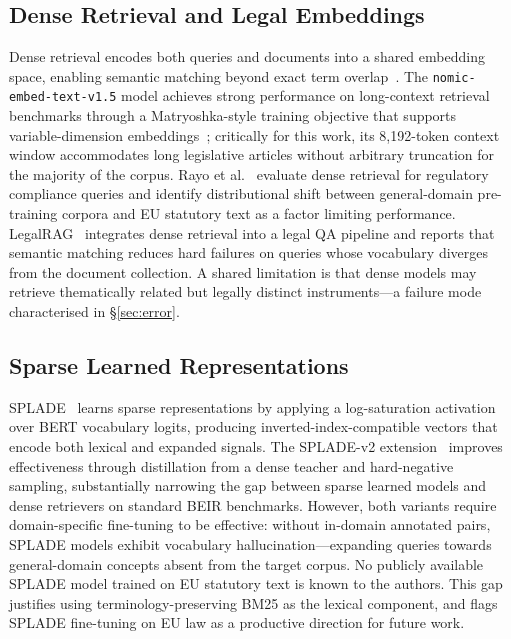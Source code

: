 \documentclass[sigconf,screen]{acmart}
\newcommand{\nomic}{\texttt{nomic-embed-text-v1.5}\xspace}
\begin{document}
\subsection{Dense Retrieval and Legal Embeddings}
\label{sec:related-dense}

Dense retrieval encodes both queries and documents into a shared
embedding space, enabling semantic matching beyond exact term
overlap~\cite{nussbaum2024nomic}.  The \nomic model achieves strong
performance on long-context retrieval benchmarks through a
Matryoshka-style training objective that supports variable-dimension
embeddings~\cite{nussbaum2024nomic}; critically for this work, its
8{,}192-token context window accommodates long legislative articles
without arbitrary truncation for the majority of the corpus.  Rayo
et al.~\cite{rayo2024} evaluate dense retrieval for regulatory
compliance queries and identify distributional shift between
general-domain pre-training corpora and EU statutory text as a
factor limiting performance.  LegalRAG~\cite{legalrag2024} integrates
dense retrieval into a legal QA pipeline and reports that semantic
matching reduces hard failures on queries whose vocabulary diverges
from the document collection.  A shared limitation is that dense
models may retrieve thematically related but legally distinct
instruments---a failure mode characterised in \S\ref{sec:error}.

\subsection{Sparse Learned Representations}
\label{sec:related-splade}

SPLADE~\cite{formal2021splade} learns sparse representations by
applying a log-saturation activation over BERT vocabulary logits,
producing inverted-index-compatible vectors that encode both lexical
and expanded signals.  The SPLADE-v2 extension~\cite{formal2022splade2}
improves effectiveness through distillation from a dense teacher and
hard-negative sampling, substantially narrowing the gap between
sparse learned models and dense retrievers on standard BEIR
benchmarks.  However, both variants require domain-specific
fine-tuning to be effective: without in-domain annotated pairs,
SPLADE models exhibit vocabulary hallucination---expanding queries
towards general-domain concepts absent from the target corpus.  No
publicly available SPLADE model trained on EU statutory text is known
to the authors.  This gap justifies using terminology-preserving BM25
as the lexical component, and flags SPLADE fine-tuning on EU law as a
productive direction for future work.
\end{document}
